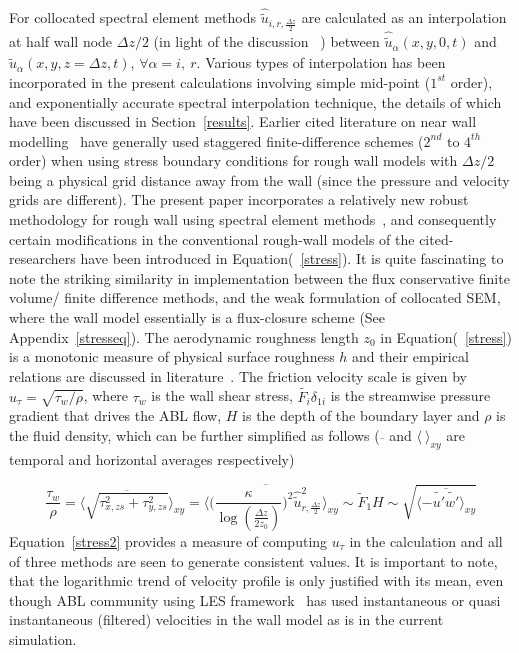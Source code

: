 For collocated spectral element methods $\widehat{\widetilde{u}}_{i,r,\frac{\Delta z}{2}}$ are calculated as an interpolation at half wall node $\Delta z/2$ (in light of the discussion~\cite{brass,lars} ) between $\widehat{\widetilde{u}}_{\alpha}(x,y,0,t)$ and $\widehat{\widetilde{u}}_{\alpha}(x,y,z=\Delta z,t)$, $\forall \alpha = i,\ r$. Various types of interpolation has been incorporated in the present calculations involving simple mid-point ($1^{st}$ order), and exponentially accurate spectral interpolation technique, the details of which have been discussed in Section~\ref{results}. Earlier cited literature on near wall modelling~\cite{deardoff,schumann,grot,moeng1,pio_wall,bal2,porte1fun,meyers2} have generally used staggered finite-difference schemes ($2^{nd}$ to $4^{th }$ order) when using stress boundary conditions for rough wall models with $\Delta z/2$ being a physical grid distance away from the wall (since the pressure and velocity grids are different). The present paper incorporates a relatively new robust methodology for rough wall using spectral element methods~\cite{tan}, and consequently certain modifications in the conventional rough-wall models of the cited-researchers have been introduced in Equation(~\ref{stress}). It is quite fascinating to note the striking  similarity in implementation between the flux conservative finite volume/ finite difference methods, and the weak formulation of collocated SEM, where the wall model essentially is a flux-closure scheme (See Appendix~\ref{stresseq}).
The aerodynamic roughness length $z_0$ in Equation(~\ref{stress}) is a monotonic measure of physical surface roughness $h$ and their empirical relations are discussed in literature~\cite{bhag,taft,cast}. The friction velocity scale is given by $u_{\tau} = \sqrt{{\tau_{w}}/{\rho}}$, where $\tau_{w}$ is the wall shear stress, $\widetilde{F_{i}}\delta_{1i}$  is the streamwise pressure gradient that drives the ABL flow, $H$ is the depth of the boundary layer and $\rho$ is the fluid density, which can be further simplified as follows ($\overline{}$ and $\langle \ \rangle_{xy}$ are temporal and horizontal averages respectively)

\begin{equation}
\frac{\tau_{w}}{\rho} = \langle\overline{\sqrt{\tau_{x,zs}^{2} + \tau_{y,zs}^2}}\rangle_{xy} = \langle\overline{\bigg(\frac{\kappa}{\log (\frac{\Delta z}{2z_0})}\bigg)^{2}\widehat{\widetilde{u}}_{r,\frac{\Delta z}{2}}^{2}}\rangle_{xy} \sim \widetilde{F}_{1}H \sim \sqrt{\langle-\overline{\widetilde{u'}\widetilde{w'}}\rangle_{xy}} \label{stress2}
\end{equation}
Equation~\ref{stress2} provides a measure of computing $u_{\tau}$ in the calculation and all of three methods are seen to generate consistent values.
It is important to note, that the logarithmic trend of velocity profile is only justified with its mean, even though ABL community using LES framework~\cite{sull,brass,porte1a,meyers2} has used instantaneous or quasi instantaneous  (filtered) velocities in the wall model as is in the current simulation.

